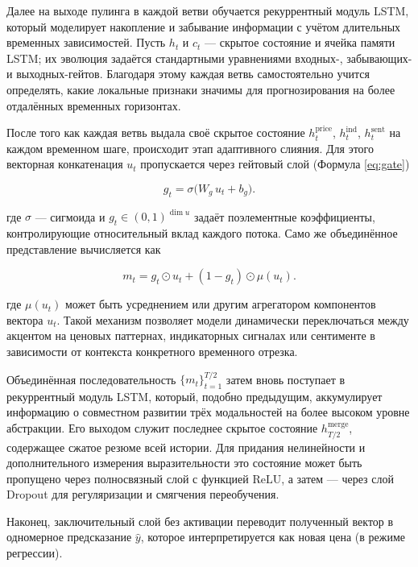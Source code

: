 Далее на выходе пулинга в каждой ветви обучается рекуррентный модуль LSTM, который моделирует накопление
и забывание информации с учётом длительных временных зависимостей. Пусть $h_t$ и $c_t$ — скрытое состояние
и ячейка памяти LSTM; их эволюция задаётся стандартными уравнениями входных-, забывающих- и выходных-гейтов. Благодаря
этому каждая ветвь самостоятельно учится определять, какие локальные признаки значимы для прогнозирования
на более отдалённых временных горизонтах.

После того как каждая ветвь выдала своё скрытое состояние $h_t^{\mathrm{price}}$, $h_t^{\mathrm{ind}}$, $h_t^{\mathrm{sent}}$
на каждом временном шаге, происходит этап адаптивного слияния. Для этого векторная конкатенация $u_t$ пропускается через
гейтовый слой (Формула \ref{eq:gate})

\begin{equation}\label{eq:gate}
    g_t = \sigma\bigl(W_g\,u_t + b_g\bigr).
\end{equation}

где $\sigma$ --- сигмоида и $g_t\in(0,1)^{\dim u}$ задаёт поэлементные коэффициенты,
контролирующие относительный вклад каждого потока. Само же объединённое представление вычисляется как

\begin{equation}
    m_t = g_t\odot u_t + (1-g_t)\odot\mu(u_t).
\end{equation}

где $\mu(u_t)$ может быть усреднением или другим агрегатором компонентов вектора $u_t$.
Такой механизм позволяет модели динамически переключаться между акцентом на ценовых паттернах,
индикаторных сигналах или сентименте в зависимости от контекста конкретного временного отрезка.

Объединённая последовательность $\{m_t\}_{t=1}^{T/2}$ затем вновь поступает в рекуррентный модуль
LSTM, который, подобно предыдущим, аккумулирует информацию о совместном развитии трёх модальностей
на более высоком уровне абстракции. Его выходом служит последнее скрытое состояние
$h_{T/2}^{\mathrm{merge}}$, содержащее сжатое резюме всей истории. Для придания нелинейности
и дополнительного измерения выразительности это состояние может быть пропущено через полносвязный
слой с функцией $\mathrm{ReLU}$, а затем — через слой Dropout для регуляризации и смягчения переобучения.

Наконец, заключительный слой без активации переводит полученный вектор в одномерное предсказание
$\hat y$, которое интерпретируется как новая цена (в режиме регрессии).

